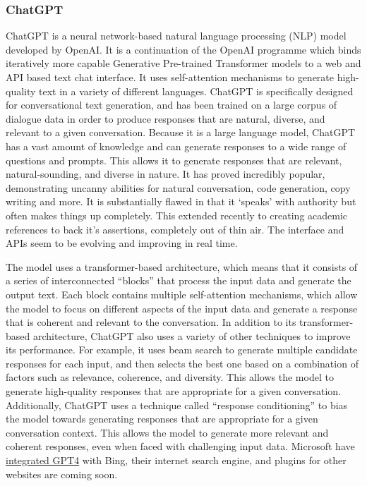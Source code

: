 \subsubsection{ChatGPT}
ChatGPT is a neural network-based natural language processing (NLP) model developed by OpenAI. It is a continuation of the OpenAI programme which binds iteratively more capable Generative Pre-trained Transformer models to a web and API based text chat interface. It uses self-attention mechanisms to generate high-quality text in a variety of different languages. ChatGPT is specifically designed for conversational text generation, and has been trained on a large corpus of dialogue data in order to produce responses that are natural, diverse, and relevant to a given conversation. Because it is a large language model, ChatGPT has a vast amount of knowledge and can generate responses to a wide range of questions and prompts. This allows it to generate responses that are relevant, natural-sounding, and diverse in nature. It has proved incredibly popular, demonstrating uncanny abilities for natural conversation, code generation, copy writing and more. It is substantially flawed in that it `speaks' with authority but often makes things up completely. This extended recently to creating academic references to back it's assertions, completely out of thin air. The interface and APIs seem to be evolving and improving in real time.\par
The model uses a transformer-based architecture, which means that it consists of a series of interconnected ``blocks'' that process the input data and generate the output text. Each block contains multiple self-attention mechanisms, which allow the model to focus on different aspects of the input data and generate a response that is coherent and relevant to the conversation. In addition to its transformer-based architecture, ChatGPT also uses a variety of other techniques to improve its performance. For example, it uses beam search to generate multiple candidate responses for each input, and then selects the best one based on a combination of factors such as relevance, coherence, and diversity. This allows the model to generate high-quality responses that are appropriate for a given conversation. Additionally, ChatGPT uses a technique called ``response conditioning'' to bias the model towards generating responses that are appropriate for a given conversation context. This allows the model to generate more relevant and coherent responses, even when faced with challenging input data. Microsoft have  \href{https://medium.com/@owenyin/scoop-oh-the-things-youll-do-with-bing-s-chatgpt-62b42d8d7198}{integrated GPT4} with Bing, their internet search engine, and plugins for other websites are coming soon.\par 
